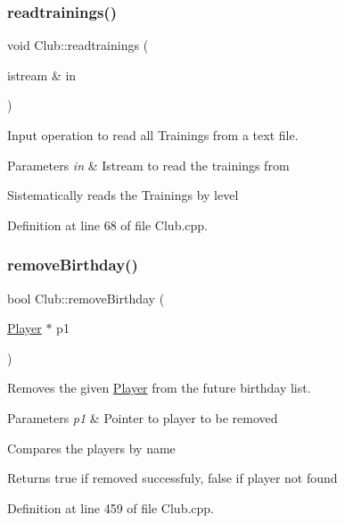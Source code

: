 \subsubsection{\texorpdfstring{readtrainings()}{readtrainings()}}
{\footnotesize\ttfamily void Club\+::readtrainings (\begin{DoxyParamCaption}\item[{istream \&}]{in }\end{DoxyParamCaption})}



Input operation to read all Trainings from a text file. 


\begin{DoxyParams}{Parameters}
{\em in} & Istream to read the trainings from\\
\hline
\end{DoxyParams}
Sistematically reads the Trainings by level 

Definition at line 68 of file Club.\+cpp.

\hypertarget{class_club_afccacb082df30292238e2da709c9c044}{}\label{class_club_afccacb082df30292238e2da709c9c044} 
\subsubsection{\texorpdfstring{remove\+Birthday()}{removeBirthday()}}
{\footnotesize\ttfamily bool Club\+::remove\+Birthday (\begin{DoxyParamCaption}\item[{\hyperlink{class_player}{Player} $\ast$}]{p1 }\end{DoxyParamCaption})}



Removes the given \hyperlink{class_player}{Player} from the future birthday list. 


\begin{DoxyParams}{Parameters}
{\em p1} & Pointer to player to be removed\\
\hline
\end{DoxyParams}
Compares the players by name

\begin{DoxyReturn}{Returns}
true if removed successfuly, false if player not found 
\end{DoxyReturn}


Definition at line 459 of file Club.\+cpp.

\hypertarget{class_club_ad09dd0ccccf5bd9dd465778ad127f41a}{}\label{class_club_ad09dd0ccccf5bd9dd465778ad127f41a} 

